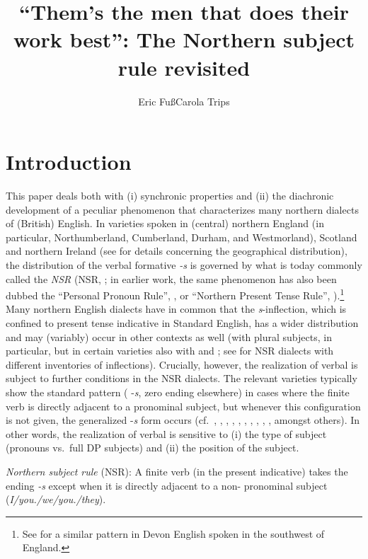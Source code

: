 \documentclass[output=paper]{langsci/langscibook}
\author{Eric Fuß\affiliation{Ruhr University Bochum}\lastand Carola
Trips\affiliation{University of Mannheim}}
\title{“Them’s the men that does their work best”: The Northern subject rule
revisited}
\begin{document}
\glsresetall

\section{Introduction}\label{sec:intro}

This paper deals both with (i) synchronic properties and (ii) the diachronic
development of a peculiar  phenomenon that characterizes many northern
dialects of (British) English. In varieties spoken in (central) northern
England (in particular, Northumberland, Cumberland, Durham, and Westmorland),
Scotland and northern Ireland (see \citealt{Pietsch:2005a,Pietsch:2005b} for
details concerning the geographical distribution), the distribution of the
verbal  formative \emph{-s} is governed by what is today commonly
called the \emph{\glsdesc{NSR}} (\gls{NSR},
\citealt[221]{Ihalainen:1994}; in earlier work, the same phenomenon has also
been dubbed the ``Personal Pronoun Rule'', \citealt{McIntosh:1988}, or ``Northern
Present Tense Rule'', \citealt{Montgomery:1994}).\footnote{See
\cite{GodfreyTagliamonte:1999} for a similar pattern in Devon English spoken in
the southwest of England.} Many northern English dialects have in common that
the \emph{s}-inflection, which is confined to \Tsg{} present tense indicative in
Standard English, has a wider distribution and may (variably) occur in other
contexts as well (with plural subjects, in particular, but in certain varieties
also with \Fsg{} and \Ssg{}; see \citealt{Pietsch:2005a,Pietsch:2005b} for \gls{NSR}
dialects with different inventories of inflections). Crucially, however, the
realization of verbal  is subject to further conditions in the \gls{NSR}
dialects. The relevant varieties typically show the standard  pattern
(\Tsg{} -\emph{s}, zero ending elsewhere) in cases where the finite verb is
directly adjacent to a pronominal subject, but whenever this configuration is
not given, the generalized -\emph{s} form occurs (cf.\ \citealt{Murray:1873},
\citealt{Berndt1956}, \citealt{McIntosh:1988}, \citealt{Montgomery:1994},
\citealt{Schendl:1996b}, \citealt{Corrigan:1997},
\citealt{Boerjarschapman:1998}, \citealt{Klemola:2000},
\citealt{Pietsch:2005a,Pietsch:2005b}, \citealt{deHaas:2011}, amongst others).
In other words, the realization of verbal  is sensitive to (i) the
type of subject (pronouns vs.\ full DP subjects) and (ii) the position of the
subject.

\ea \textit{Northern subject rule} (\gls{NSR}): A finite verb
  (in the present indicative) takes the ending \emph{-s} except when it is
  directly adjacent to a non-\Tsg{} pronominal subject
  (\emph{I/you.\Sg/we/you.\Pl/they}).
\z
\end{document}
